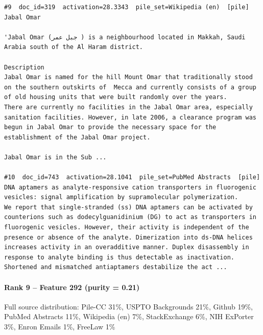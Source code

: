 \begin{verbatim}
#9  doc_id=319  activation=28.3343  pile_set=Wikipedia (en)  [pile]
Jabal Omar

'Jabal Omar (جبل عمر ) is a neighbourhood located in Makkah, Saudi Arabia south of the Al Haram district.

Description 
Jabal Omar is named for the hill Mount Omar that traditionally stood on the southern outskirts of  Mecca and currently consists of a group of old housing units that were built randomly over the years. 
There are currently no facilities in the Jabal Omar area, especially sanitation facilities. However, in late 2006, a clearance program was begun in Jabal Omar to provide the necessary space for the establishment of the Jabal Omar project. 

Jabal Omar is in the Sub ...

#10  doc_id=743  activation=28.1041  pile_set=PubMed Abstracts  [pile]
DNA aptamers as analyte-responsive cation transporters in fluorogenic vesicles: signal amplification by supramolecular polymerization.
We report that single-stranded (ss) DNA aptamers can be activated by counterions such as dodecylguanidinium (DG) to act as transporters in fluorogenic vesicles. However, their activity is independent of the presence or absence of the analyte. Dimerization into ds-DNA helices increases activity in an overadditive manner. Duplex disassembly in response to analyte binding is thus detectable as inactivation. Shortened and mismatched antiaptamers destabilize the act ...

\end{verbatim}

\paragraph*{Rank 9 -- Feature 292 (purity = 0.21)}

Full source distribution: Pile-CC 31\%, USPTO Backgrounds 21\%, Github 19\%, PubMed Abstracts 11\%, Wikipedia (en) 7\%, StackExchange 6\%, NIH ExPorter 3\%, Enron Emails 1\%, FreeLaw 1\%

